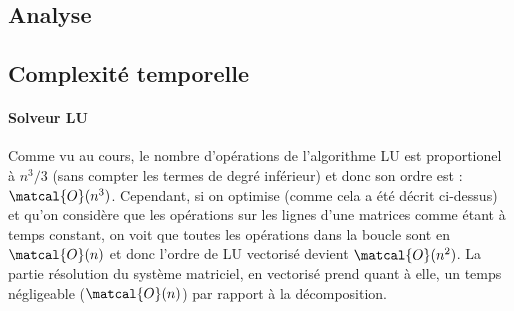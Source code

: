 \documentclass[11pt]{article}
\begin{document}
\subsection*{Analyse}
\vspace{-5pt}
\subsection{Complexité temporelle}
\vspace{-5pt}
\paragraph{Solveur LU} Comme vu au cours, le nombre d'opérations de l'algorithme LU est proportionel à $n^3/3$ (sans compter les termes de degré inférieur) et donc son ordre est : $\matcal{O}(n^3)$. Cependant, si on optimise (comme cela a été décrit ci-dessus) et qu'on considère que les opérations sur les lignes d'une matrices comme étant à temps constant, on voit que toutes les opérations dans la boucle sont en $\matcal{O}(n)$ et donc l'ordre de LU vectorisé devient $\matcal{O}(n^2)$. La partie résolution du système matriciel, en vectorisé prend quant à elle, un temps négligeable ($\matcal{O}(n)$) par rapport à la décomposition.
\vspace{-5pt}
\end{document}
